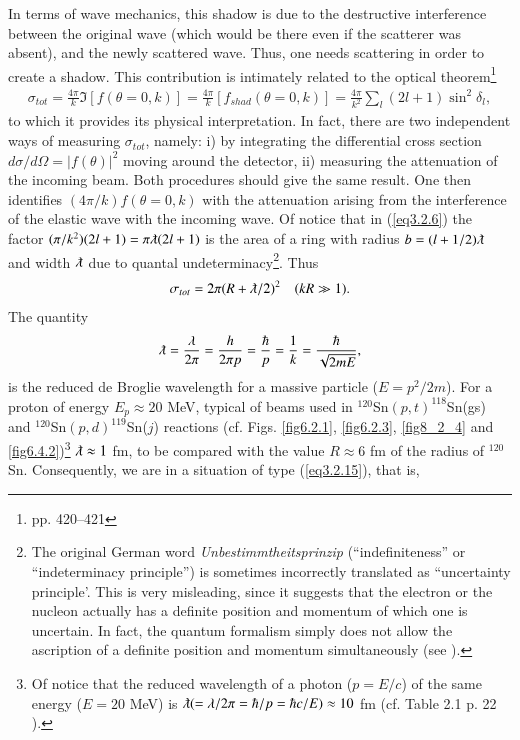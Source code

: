 In terms of wave mechanics, this shadow is due to the destructive interference between the original wave (which would be there even if the scatterer was absent), and the newly scattered wave. Thus, one needs scattering in order to create a shadow. This contribution is intimately related to the optical theorem\footnote{\cite{Sakurai:94} pp. 420--421}
\begin{align}\label{eq3.2.9}
\sigma_{tot}=\frac{4\pi}{k}\Im[f(\theta=0,k)]=\frac{4\pi}{k}[f_{shad}(\theta=0,k)]=\frac{4\pi}{k^2}\sum_l(2l+1)\sin^2\delta_l,
\end{align}
to which it provides its physical interpretation. In fact,  there are two independent ways of measuring $\sigma_{tot}$, namely: i) by integrating the differential cross section $d\sigma/d\Omega=|f(\theta)|^2$ moving around the detector, ii) measuring the attenuation of the incoming beam. Both procedures should give the same result. One then identifies $(4\pi/k)f(\theta=0,k)$ with the attenuation arising from the interference of the elastic wave with the incoming wave. Of notice that in (\ref{eq3.2.6}) the factor $(\pi/k^2)(2l+1)=\pi\lambdabar(2l+1)$ is the area of a ring  with radius $b=(l+1/2)\lambdabar$ and width $\lambdabar$ due to quantal undeterminacy\footnote{The original German word \textit{Unbestimmtheitsprinzip} (``indefiniteness'' or ``indeterminacy principle'') is sometimes incorrectly translated as ``uncertainty principle'. This is very misleading, since it suggests that the electron or the nucleon actually has a definite position and momentum of which one is uncertain. In fact, the quantum formalism simply does not allow the ascription of a definite position and momentum simultaneously (see \cite{Leggett:87}).}. Thus
\begin{align}\label{eq3.2.15}
\sigma_{tot}=2\pi(R+\lambdabar/2)^2\quad(kR\gg1).
\end{align}
The quantity
\begin{align}
\lambdabar=\frac{\lambda}{2\pi}=\frac{h}{2\pi p}=\frac{\hbar}{p}=\frac{1}{k}=\frac{\hbar}{\sqrt{2mE}},
\end{align}
is the reduced de Broglie wavelength for a massive particle ($E=p^2/2m$). For a proton of energy $E_p\approx 20$ MeV, typical of beams used in $^{120}$Sn$(p,t)^{118}$Sn(gs) and $^{120}$Sn$(p,d)^{119}$Sn($j$) reactions (cf. Figs. \ref{fig6.2.1}, \ref{fig6.2.3}, \ref{fig8_2_4} and \ref{fig6.4.2})\footnote{Of notice that the reduced wavelength of a photon ($p=E/c$) of the same energy ($E= 20$ MeV) is $\lambdabar (=\lambda/2\pi=\hbar/p=\hbar c/E)\approx 10$ fm (cf. Table 2.1 p. 22 \cite{Satchler:80}).} $\lambdabar\approx 1$ fm, to be compared with the value $R\approx 6$ fm of the radius of $^{120}$Sn. Consequently, we are in a situation of type (\ref{eq3.2.15}), that is,
